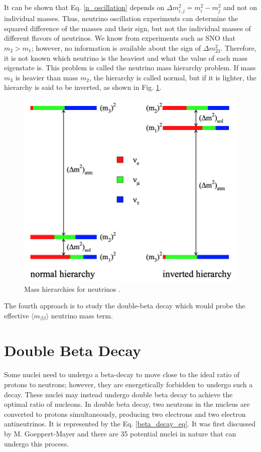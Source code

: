 It can be shown that Eq. \ref{n_oscillation} depends on $\Delta m^2_{i,j}=m^2_i-m^2_j$ and not on individual masses. Thus, neutrino oscillation experiments can determine the squared difference of the masses and their sign, but not the individual masses of different flavors of neutrinos. We know from experiments such as SNO that $m_2>m_1$; however, no information is available about the sign of $\Delta m_{23}^2$. Therefore, it is not known which neutrino is the heaviest and what the value of each mass eigenstate is. This problem is called the neutrino mass hierarchy problem. If mass $m_3$ is heavier than mass $m_2$, the hierarchy is called normal, but if it is lighter, the hierarchy is said to be inverted, as shown in Fig. \ref{mass_hierarchies_fig}.

\begin{figure}%
\centering
\includegraphics[scale=0.25]{ch1/figs/mass_hierarchies.png}
\caption{Mass hierarchies for neutrinos \cite{Hewett:2012ns}.}
\label{mass_hierarchies_fig}
\end{figure}

The fourth approach is to study the double-beta decay which would probe the effective $\langle m_{\beta\beta}\rangle$ neutrino mass term.

\section{Double Beta Decay}
Some nuclei need to undergo a beta-decay to move close to the ideal ratio of protons to neutrons; however, they are energetically forbidden to undergo such a decay. These nuclei may instead undergo double beta decay to achieve the optimal ratio of nucleons. In double beta decay, two neutrons in the nucleus are converted to protons simultaneously, producing two electrons and two electron antineutrinos. It is represented by the Eq. \ref{beta_decay_eq}. It was first discussed by M. Goeppert-Mayer and there are 35 potential nuclei in nature that can undergo this process\cite{ZUBER_2012}.

